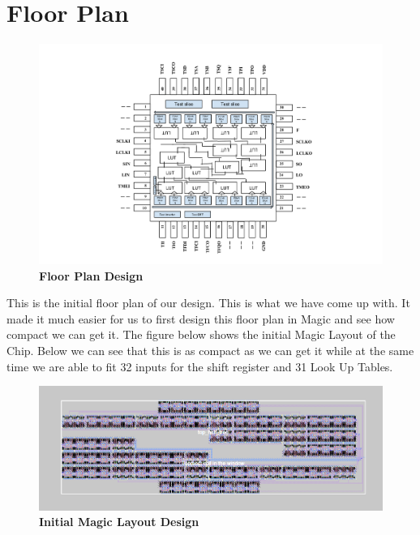 \documentclass[a4paper]{article}
\begin{document}
\section{\textbf{Floor Plan}}
    \begin{figure}[H]
        \centering
        \includegraphics[width=\textwidth,height=\textheight,keepaspectratio]{../../floor_plan/floor_plan.png}
        \caption{\textbf{Floor Plan Design}}
        \label{fig:gg}
    \end{figure}

    This is the initial floor plan of our design. This is what we have come up with. It made it much easier
    for us to first design this floor plan in Magic and see how compact we can get it. The figure below shows
    the initial Magic Layout of the Chip. Below we can see that this is as compact as we can get it while at the
    same time we are able to fit 32 inputs for the shift register and 31 Look Up Tables.

    \begin{figure}[H]
        \centering
        \includegraphics[width=\textwidth,height=\textheight,keepaspectratio]{../../magic/new_method/layout/initial_layout.png}
        \caption{\textbf{Initial Magic Layout Design}}
        \label{fig:gg}
    \end{figure}
\end{document}
